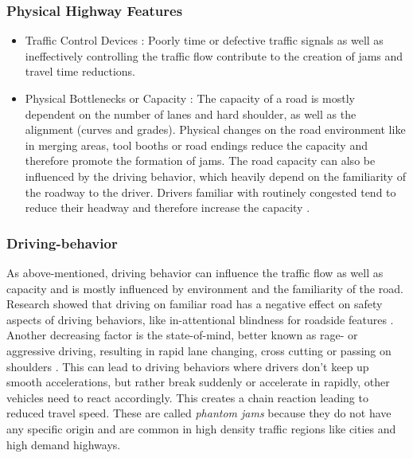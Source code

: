 \subsubsection{Physical Highway Features}

\begin{itemize}
	\item Traffic Control Devices : Poorly time or defective traffic signals as well as ineffectively controlling the traffic flow contribute to the creation of jams and travel time reductions.
	\item Physical Bottlenecks or Capacity : The capacity of a road is mostly dependent on the number of lanes and hard shoulder, as well as the alignment (curves and grades). Physical changes on the road environment like in merging areas, tool booths or road endings reduce the capacity and therefore promote the formation of jams. The road capacity can also be influenced by the driving behavior, which heavily depend on the familiarity of the roadway to the driver. Drivers familiar with routinely congested tend to reduce their headway and therefore increase the capacity \parencite{Charlton2013}.
\end{itemize}

\subsubsection{Driving-behavior}
As above-mentioned, driving behavior can influence the traffic flow as well as capacity and is mostly influenced by environment and the familiarity of the road. Research showed that driving on familiar road has a negative effect on safety aspects of driving behaviors, like in-attentional blindness for roadside features \parencite{Charlton2013}. Another decreasing factor is the state-of-mind, better known as rage- or aggressive driving, resulting in rapid lane changing, cross cutting or passing on shoulders \parencite{Shinar2004}. This can lead to driving behaviors where drivers don't keep up smooth accelerations, but rather break suddenly or accelerate in rapidly, other vehicles need to react accordingly. This creates a chain reaction leading to reduced travel speed. These are called \textit{phantom jams} because they do not have any specific origin and are common in high density traffic regions like cities and high demand highways. \parencite{ASTRA2020} 

\bigskip

